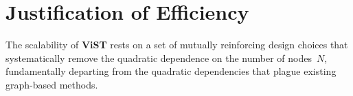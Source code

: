 
% 

\section{Justification of  Efficiency}
The scalability of \textbf{ViST} rests on a set of mutually reinforcing design choices that systematically remove the quadratic dependence on the number of nodes~$N$, fundamentally departing from the quadratic dependencies that plague existing graph-based methods.

